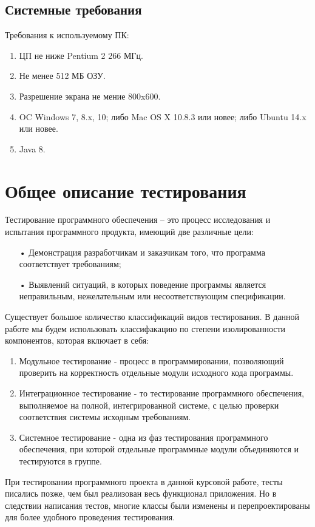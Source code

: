 \documentclass[a4paper,12pt]{article}
\begin{document}
\subsection{Системные требования}
Требования к используемому ПК:
\begin{enumerate}
\item ЦП не ниже Pentium 2 266 МГц.
\item Не менее 512 МБ ОЗУ.
\item Разрешение экрана не мение 800x600.
\item OC Windows 7, 8.x, 10; либо Mac OS X 10.8.3 или новее; либо Ubuntu 14.x или новее.
\item Java 8.
\end{enumerate}


\newpage\section{Общее описание тестирования}
Тестирование программного обеспечения – это процесс исследования и испытания программного продукта, имеющий две различные цели: 
\begin{itemize}
\item[•]Демонстрация разработчикам и заказчикам того, что программа соответствует требованиям;
\item[•]Выявлений ситуаций, в которых поведение программы является неправильным, нежелательным или несоответствующим спецификации.
\end{itemize}
Существует большое количество классификаций видов тестирования. В данной работе мы будем использовать классифакацию по степени изолированности компонентов, которая включает в себя: 
\begin{enumerate}
\item Модульное тестирование - процесс в программировании, позволяющий проверить на корректность отдельные модули исходного кода программы.
\item Интеграционное тестирование - то тестирование программного обеспечения, выполняемое на полной, интегрированной системе, с целью проверки соответствия системы исходным требованиям.
\item Системное тестирование - одна из фаз тестирования программного обеспечения, при которой отдельные программные модули объединяются и тестируются в группе.
\end{enumerate}
\par При тестировании программного проекта в данной курсовой работе, тесты писались позже, чем был реализован весь функционал приложения. Но в следствии написания тестов, многие классы были изменены и перепроектированы для более удобного проведения тестирования.
\end{document}
